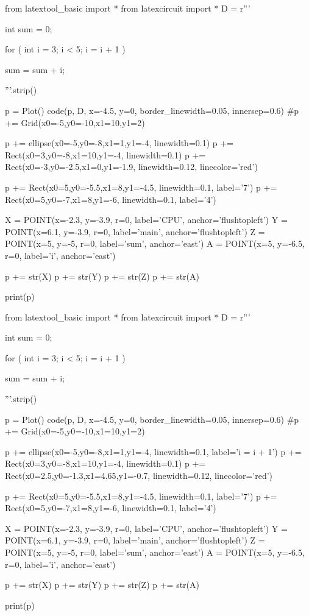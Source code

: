 \begin{python}
from latextool_basic import *
from latexcircuit import *
D = r'''



int sum = 0;

    for ( int i = 3;     i < 5;     i = i + 1 )


        sum = sum + i;



'''.strip()

p = Plot()
code(p, D, x=-4.5, y=0, border_linewidth=0.05, innersep=0.6)
#p += Grid(x0=-5,y0=-10,x1=10,y1=2)

p += ellipse(x0=-5,y0=-8,x1=1,y1=-4, linewidth=0.1)
p += Rect(x0=3,y0=-8,x1=10,y1=-4, linewidth=0.1)
p += Rect(x0=-3,y0=-2.5,x1=0,y1=-1.9, linewidth=0.12, linecolor='red')

p += Rect(x0=5,y0=-5.5,x1=8,y1=-4.5, linewidth=0.1, label='7')
p += Rect(x0=5,y0=-7,x1=8,y1=-6, linewidth=0.1, label='4')

X = POINT(x=-2.3, y=-3.9, r=0, label='CPU', anchor='flushtopleft')
Y = POINT(x=6.1, y=-3.9, r=0, label='main', anchor='flushtopleft')
Z = POINT(x=5, y=-5, r=0, label='sum', anchor='east')
A = POINT(x=5, y=-6.5, r=0, label='i', anchor='east')

p += str(X)
p += str(Y)
p += str(Z)
p += str(A)

print(p)
\end{python}

\begin{python}
from latextool_basic import *
from latexcircuit import *
D = r'''



int sum = 0;

    for ( int i = 3;     i < 5;     i = i + 1 )


        sum = sum + i;



'''.strip()

p = Plot()
code(p, D, x=-4.5, y=0, border_linewidth=0.05, innersep=0.6)
#p += Grid(x0=-5,y0=-10,x1=10,y1=2)

p += ellipse(x0=-5,y0=-8,x1=1,y1=-4, linewidth=0.1, label='i = i + 1')
p += Rect(x0=3,y0=-8,x1=10,y1=-4, linewidth=0.1)
p += Rect(x0=2.5,y0=-1.3,x1=4.65,y1=-0.7, linewidth=0.12, linecolor='red')

p += Rect(x0=5,y0=-5.5,x1=8,y1=-4.5, linewidth=0.1, label='7')
p += Rect(x0=5,y0=-7,x1=8,y1=-6, linewidth=0.1, label='4')

X = POINT(x=-2.3, y=-3.9, r=0, label='CPU', anchor='flushtopleft')
Y = POINT(x=6.1, y=-3.9, r=0, label='main', anchor='flushtopleft')
Z = POINT(x=5, y=-5, r=0, label='sum', anchor='east')
A = POINT(x=5, y=-6.5, r=0, label='i', anchor='east')

p += str(X)
p += str(Y)
p += str(Z)
p += str(A)

print(p)
\end{python}

